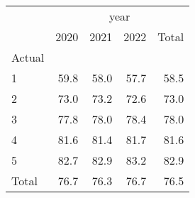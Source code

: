 \documentclass{article}
\begin{document}
\begin{minipage}[b]{.40\textwidth}
	\centering
\begin{tabular}{lllll}
	\cline{1-5}
	\multicolumn{1}{c}{} &
	\multicolumn{4}{|c}{year} \\
	\multicolumn{1}{c}{} &
	\multicolumn{1}{|r}{2020} &
	\multicolumn{1}{r}{2021} &
	\multicolumn{1}{r}{2022} &
	\multicolumn{1}{r}{Total} \\
	\cline{1-5}
	\multicolumn{1}{l}{Actual} &
	\multicolumn{1}{|r}{} &
	\multicolumn{1}{r}{} &
	\multicolumn{1}{r}{} &
	\multicolumn{1}{r}{} \\
	\multicolumn{1}{l}{\hspace{1em}1} &
	\multicolumn{1}{|r}{59.8} &
	\multicolumn{1}{r}{58.0} &
	\multicolumn{1}{r}{57.7} &
	\multicolumn{1}{r}{58.5} \\
	\multicolumn{1}{l}{\hspace{1em}2} &
	\multicolumn{1}{|r}{73.0} &
	\multicolumn{1}{r}{73.2} &
	\multicolumn{1}{r}{72.6} &
	\multicolumn{1}{r}{73.0} \\
	\multicolumn{1}{l}{\hspace{1em}3} &
	\multicolumn{1}{|r}{77.8} &
	\multicolumn{1}{r}{78.0} &
	\multicolumn{1}{r}{78.4} &
	\multicolumn{1}{r}{78.0} \\
	\multicolumn{1}{l}{\hspace{1em}4} &
	\multicolumn{1}{|r}{81.6} &
	\multicolumn{1}{r}{81.4} &
	\multicolumn{1}{r}{81.7} &
	\multicolumn{1}{r}{81.6} \\
	\multicolumn{1}{l}{\hspace{1em}5} &
	\multicolumn{1}{|r}{82.7} &
	\multicolumn{1}{r}{82.9} &
	\multicolumn{1}{r}{83.2} &
	\multicolumn{1}{r}{82.9} \\
	\multicolumn{1}{l}{\hspace{1em}Total} &
	\multicolumn{1}{|r}{76.7} &
	\multicolumn{1}{r}{76.3} &
	\multicolumn{1}{r}{76.7} &
	\multicolumn{1}{r}{76.5} \\
	\cline{1-5}
\end{tabular}
\end{minipage}\qquad
\end{document}
